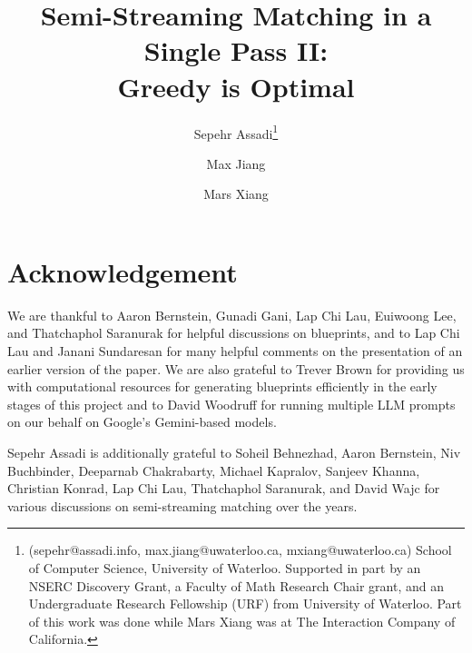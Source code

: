 \documentclass[11pt]{article}
\title{Semi-Streaming Matching in a Single Pass II: \\ Greedy is Optimal}
\author{Sepehr Assadi\footnote{(sepehr@assadi.info, max.jiang@uwaterloo.ca, mxiang@uwaterloo.ca) School of Computer Science, University of Waterloo. Supported in part by an NSERC
Discovery Grant, a Faculty of Math Research Chair grant, and an Undergraduate Research Fellowship (URF) from University of Waterloo. \newline  Part of this work was done while Mars Xiang was
at The Interaction Company of California. \smallskip} 
\and Max Jiang\samethanks  \and Mars Xiang\samethanks  
}
\date{}
\theoremstyle{definition}
\begin{document}
\maketitle



\clearpage


\setcounter{tocdepth}{2}
\tableofcontents
\clearpage

\setcounter{page}{1}

\clearpage



\clearpage



\clearpage



\clearpage



\section*{Acknowledgement} 

We are thankful to Aaron Bernstein, Gunadi Gani, Lap Chi Lau, Euiwoong Lee, and Thatchaphol Saranurak for helpful discussions on blueprints, and to Lap Chi Lau and Janani Sundaresan for 
many helpful comments on the presentation of an earlier version of the paper. We are also grateful to Trever Brown for providing us with computational resources for generating
blueprints efficiently in the early stages of this project and to David Woodruff for running multiple LLM prompts on our behalf on Google's Gemini-based models. 

  Sepehr Assadi is additionally grateful to Soheil Behnezhad, Aaron Bernstein, Niv Buchbinder, Deeparnab Chakrabarty, Michael Kapralov, Sanjeev Khanna, Christian Konrad, Lap Chi Lau, Thatchaphol Saranurak, and David Wajc for various discussions
  on semi-streaming matching over the years. 
\end{document}
